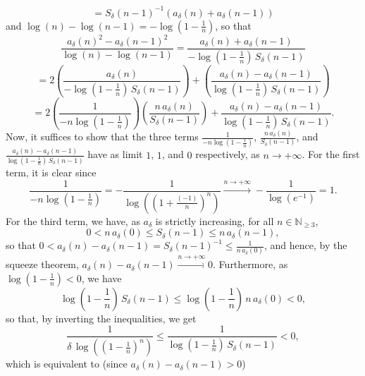 \begin{solution}
\[    \]
    \[
        = S_\delta\left(n-1\right)^{-1}\left(a_\delta\left(n\right)+a_\delta\left(n-1\right)\right)
    \]
    and \( \log\left(n\right)-\log\left(n-1\right) = -\log\left(1-\frac{1}{n}\right) \), so that
    \[
        \frac{a_\delta\left(n\right)^2-a_\delta\left(n-1\right)^2}{\log\left(n\right)-\log\left(n-1\right)} = \frac{a_\delta\left(n\right)+a_\delta\left(n-1\right)}{-\log\left(1-\frac{1}{n}\right)\,S_\delta\left(n-1\right)}
    \]
    \[
        = 2\left(\frac{a_\delta\left(n\right)}{-\log\left(1-\frac{1}{n}\right)\,S_\delta\left(n-1\right)}\right)+\left(\frac{a_\delta\left(n\right)-a_\delta\left(n-1\right)}{\log\left(1-\frac{1}{n}\right)\,S_\delta\left(n-1\right)}\right)
    \]
    \[
        = 2\left(\frac{1}{-n\log\left(1-\frac{1}{n}\right)}\right)\left(\frac{n\,a_\delta\left(n\right)}{S_\delta\left(n-1\right)}\right)+\frac{a_\delta\left(n\right)-a_\delta\left(n-1\right)}{\log\left(1-\frac{1}{n}\right)\,S_\delta\left(n-1\right)}.
    \]
    Now, it suffices to show that the three terms \( \frac{1}{-n\log\left(1-\frac{1}{n}\right)} \), \( \frac{n\,a_\delta\left(n\right)}{S_\delta\left(n-1\right)} \), and \( \frac{a_\delta\left(n\right)-a_\delta\left(n-1\right)}{\log\left(1-\frac{1}{n}\right)\,S_\delta\left(n-1\right)} \) have as limit \( 1 \), \( 1 \), and \( 0 \) respectively, as \( n \to +\infty \). For the first term, it is clear since
    \[
        \frac{1}{-n\log\left(1-\frac{1}{n}\right)} = -\frac{1}{\log\left(\left(1+\frac{\left(-1\right)}{n}\right)^n\right)} \overset{n \to +\infty}{\longrightarrow} -\frac{1}{\log\left(e^{-1}\right)} = 1.
    \]
    For the third term, we have, as \( a_\delta \) is strictly increasing, for all \( n \in \mathbb{N}_{\geq 3} \),
    \[
        0 < n\,a_\delta\left(0\right) \leq S_\delta\left(n-1\right) \leq n\,a_\delta\left(n-1\right),
    \]
    so that \( 0 < a_\delta\left(n\right)-a_\delta\left(n-1\right) = S_\delta\left(n-1\right)^{-1} \leq \frac{1}{n\,a_\delta\left(0\right)} \), and hence, by the squeeze theorem, \( a_\delta\left(n\right)-a_\delta\left(n-1\right) \overset{n \to +\infty}{\longrightarrow} 0 \). Furthermore, as \( \log\left(1-\frac{1}{n}\right) < 0 \), we have
    \[
        \log\left(1-\frac{1}{n}\right)\,S_\delta\left(n-1\right) \leq \log\left(1-\frac{1}{n}\right)\,n\,a_\delta\left(0\right) < 0,
    \]
    so that, by inverting the inequalities, we get
    \[
        \frac{1}{\delta\,\log\left(\left(1-\frac{1}{n}\right)^n\right)} \leq \frac{1}{\log\left(1-\frac{1}{n}\right)\,S_\delta\left(n-1\right)} < 0,
    \]
    which is equivalent to (since \( a_\delta\left(n\right)-a_\delta\left(n-1\right) > 0 \))

\end{solution}
